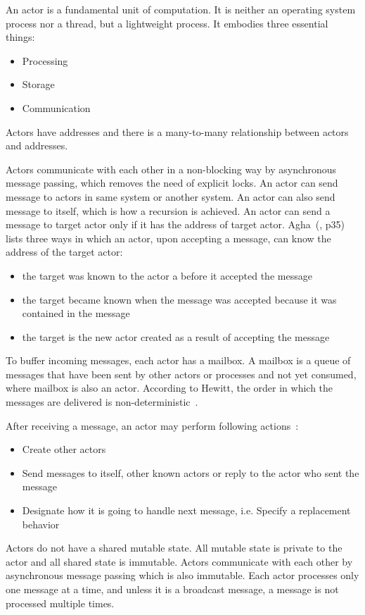   An actor is a fundamental unit of computation. It is neither an operating system process nor a thread, but a lightweight process. It embodies three essential things:
\begin{itemize}
  \item Processing
  \item Storage
  \item Communication
\end{itemize}
  Actors have addresses and there is a many-to-many relationship between actors and addresses.

  Actors communicate with each other in a non-blocking way by asynchronous message passing, which removes the need of explicit locks. An actor can send message to actors in same system or another system. An actor can also send message to itself, which is how a recursion is achieved. An actor can send a message to target actor only if it has the address of target actor. Agha~(\cite{agha}, p35) lists three ways in which an actor, upon accepting a message, can know the address of the target actor:
  \begin{itemize}
    \item the target was known to the actor a before it accepted the message
    \item the target became known when the message was accepted because it was contained in the message
    \item the target is the new actor created as a result of accepting the message
  \end{itemize}

  To buffer incoming messages, each actor has a mailbox. A mailbox is a queue of messages that have been sent by other actors or processes and not yet consumed, where mailbox is also an actor. According to Hewitt, the order in which the messages are delivered is non-deterministic~\cite{hewittVideo}.

After receiving a message, an actor may perform following actions~\cite{hewitt}:
\begin{itemize}
  \item Create other actors
  \item Send messages to itself, other known actors or reply to the actor who sent the message
  \item Designate how it is going to handle next message, i.e. Specify a replacement behavior
\end{itemize}

  Actors do not have a shared mutable state. All mutable state is private to the actor and all shared state is immutable. Actors communicate with each other by asynchronous message passing which is also immutable. Each actor processes only one message at a time, and unless it is a broadcast message, a message is not processed multiple times.

